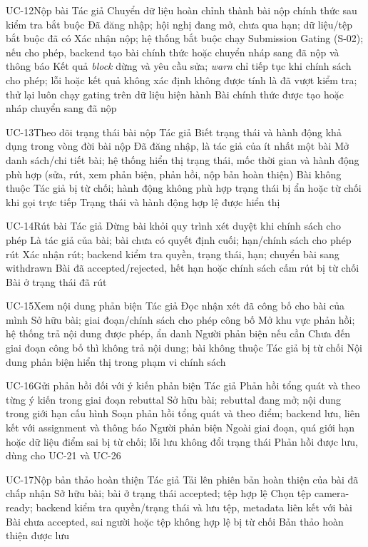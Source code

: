 \UseCaseSpec
{UC-12}{Nộp bài}
{Tác giả}
{Chuyển dữ liệu hoàn chỉnh thành bài nộp chính thức sau kiểm tra bắt buộc}
{Đã đăng nhập; hội nghị đang mở, chưa qua hạn; dữ liệu/tệp bắt buộc đã có}
{Xác nhận nộp; hệ thống bắt buộc chạy Submission Gating (S-02); nếu cho phép, backend tạo bài chính thức hoặc chuyển nháp sang đã nộp và thông báo}
{Kết quả \textit{block} dừng và yêu cầu sửa; \textit{warn} chỉ tiếp tục khi chính sách cho phép; lỗi hoặc kết quả không xác định không được tính là đã vượt kiểm tra; thử lại luôn chạy gating trên dữ liệu hiện hành}
{Bài chính thức được tạo hoặc nháp chuyển sang đã nộp}

\UseCaseSpec
{UC-13}{Theo dõi trạng thái bài nộp}
{Tác giả}
{Biết trạng thái và hành động khả dụng trong vòng đời bài nộp}
{Đã đăng nhập, là tác giả của ít nhất một bài}
{Mở danh sách/chi tiết bài; hệ thống hiển thị trạng thái, mốc thời gian và hành động phù hợp (sửa, rút, xem phản biện, phản hồi, nộp bản hoàn thiện)}
{Bài không thuộc Tác giả bị từ chối; hành động không phù hợp trạng thái bị ẩn hoặc từ chối khi gọi trực tiếp}
{Trạng thái và hành động hợp lệ được hiển thị}

\UseCaseSpec
{UC-14}{Rút bài}
{Tác giả}
{Dừng bài khỏi quy trình xét duyệt khi chính sách cho phép}
{Là tác giả của bài; bài chưa có quyết định cuối; hạn/chính sách cho phép rút}
{Xác nhận rút; backend kiểm tra quyền, trạng thái, hạn; chuyển bài sang withdrawn}
{Bài đã accepted/rejected, hết hạn hoặc chính sách cấm rút bị từ chối}
{Bài ở trạng thái đã rút}

\UseCaseSpec
{UC-15}{Xem nội dung phản biện}
{Tác giả}
{Đọc nhận xét đã công bố cho bài của mình}
{Sở hữu bài; giai đoạn/chính sách cho phép công bố}
{Mở khu vực phản hồi; hệ thống trả nội dung được phép, ẩn danh Người phản biện nếu cần}
{Chưa đến giai đoạn công bố thì không trả nội dung; bài không thuộc Tác giả bị từ chối}
{Nội dung phản biện hiển thị trong phạm vi chính sách}

\UseCaseSpec
{UC-16}{Gửi phản hồi đối với ý kiến phản biện}
{Tác giả}
{Phản hồi tổng quát và theo từng ý kiến trong giai đoạn rebuttal}
{Sở hữu bài; rebuttal đang mở; nội dung trong giới hạn cấu hình}
{Soạn phản hồi tổng quát và theo điểm; backend lưu, liên kết với assignment và thông báo Người phản biện}
{Ngoài giai đoạn, quá giới hạn hoặc dữ liệu điểm sai bị từ chối; lỗi lưu không đổi trạng thái}
{Phản hồi được lưu, dùng cho UC-21 và UC-26}

\UseCaseSpec
{UC-17}{Nộp bản thảo hoàn thiện}
{Tác giả}
{Tải lên phiên bản hoàn thiện của bài đã chấp nhận}
{Sở hữu bài; bài ở trạng thái accepted; tệp hợp lệ}
{Chọn tệp camera-ready; backend kiểm tra quyền/trạng thái và lưu tệp, metadata liên kết với bài}
{Bài chưa accepted, sai người hoặc tệp không hợp lệ bị từ chối}
{Bản thảo hoàn thiện được lưu}


